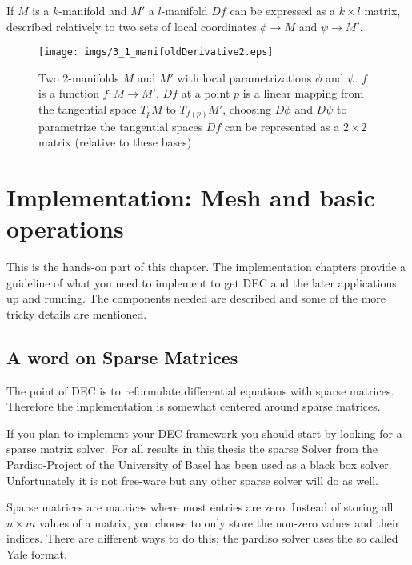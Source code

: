 If $M$ is a $k$-manifold and $M'$ a $l$-manifold $Df$ can be expressed as a $k\times l$ matrix, described relatively to two sets of local coordinates $\phi \rightarrow M$ and $\psi \rightarrow M'$.

\begin{figure}
\begin{center}
\texttt{[image: imgs/3\_1\_manifoldDerivative2.eps]}
\end{center}
\caption{Two 2-manifolds $M$ and $M'$ with local parametrizations $\phi$ and $\psi$. $f$ is a function $f: M \rightarrow M'$. $Df$ at a point $p$ is a linear mapping from the tangential space $T_p M$ to $T_{f(p)} M'$, choosing $D\phi$ and $D \psi$ to parametrize the tangential spaces $Df$ can be represented as a $2\times 2$ matrix (relative to these bases)}
\label{fig::3_1_manifoldDerivative2}
\end{figure}






\newpage
\section{Implementation: Mesh and basic operations}
This is the hands-on part of this chapter. The implementation chapters provide a guideline of what you need to implement to get DEC and the later applications up and running. The components needed are described and some of the more tricky details are mentioned.

\subsection{A word on Sparse Matrices}
The point of DEC is to reformulate differential equations with sparse matrices. Therefore the implementation is somewhat centered around sparse matrices.

If you plan to implement your DEC framework you should start by looking for a sparse matrix solver. For all results in this thesis the sparse Solver from the Pardiso-Project of the University of Basel has been used as a black box solver. Unfortunately it is not free-ware but any other sparse solver will do as well.

Sparse matrices are matrices where most entries are zero. Instead of storing all $n\times m$ values of a matrix, you choose to only store the non-zero values and their indices. There are different ways to do this; the pardiso solver uses the so called Yale format.

